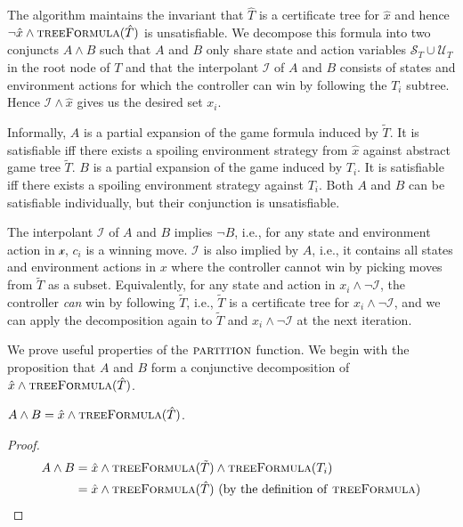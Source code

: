 The algorithm maintains the invariant that $\hat{T}$ is a certificate tree for $\hat{x}$ and hence $\lnot \hat{x} \land \textsc{treeFormula}(\hat{T})$ is unsatisfiable.  We decompose this formula into two conjuncts $A \land B$ such that $A$ and $B$ only share state and action variables $\mathcal{S}_T \cup \mathcal{U}_T$ in the root node of $T$ and that the interpolant $\mathcal{I}$ of $A$ and $B$ consists of states and environment actions for which the controller can win by following the $T_i$ subtree.  Hence $\mathcal{I}\land \hat{x}$ gives us the desired set $x_i$.  

Informally, $A$ is a partial expansion of the game formula induced by $\tilde{T}$.  It is satisfiable iff there exists a spoiling environment strategy from $\hat{x}$ against abstract game tree $\tilde{T}$.  $B$ is a partial expansion of the game induced by $T_i$.  It is satisfiable iff there exists a spoiling environment strategy against $T_i$.  Both $A$ and $B$ can be satisfiable individually, but their conjunction is unsatisfiable.

The interpolant $\mathcal{I}$ of $A$ and $B$ implies $\neg B$, i.e., for any state and environment action in $\mathcal{x}$, $c_i$ is a winning move.  $\mathcal{I}$ is also implied by $A$, i.e., it contains all states and environment actions in $x$ where the controller cannot win by picking moves from $\tilde{T}$ as a subset.  Equivalently, for any state and action in $x_i \land \neg \mathcal{I}$, the controller \emph{can} win by following $\tilde{T}$, i.e., $\tilde{T}$ is a certificate tree for $x_i \land \neg \mathcal{I}$, and we can apply the decomposition again to $\tilde{T}$ and $x_i \land \neg \mathcal{I}$ at the next iteration.


We prove useful properties of the $\textsc{partition}$ function. We begin with the proposition that $A$ and $B$ form a conjunctive decomposition of $\hat{x} \land \textsc{treeFormula}(\hat{T})$. 
\begin{proposition}\label{prop:aandb}
    $A\land B = \hat{x} \land \textsc{treeFormula}(\hat{T})$.
\end{proposition}
\begin{proof}
    \begin{align*}
        A \land B &= \hat{x} \land \textsc{treeFormula}(\tilde{T}) \land \textsc{treeFormula}(T_i) \\
                  &= \hat{x} \land \textsc{treeFormula}(\hat{T})\ \text{(by the definition of \textsc{treeFormula})}
    \end{align*}
\end{proof}


